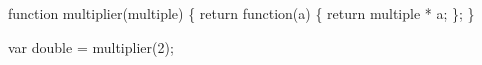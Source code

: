\begin{minipage}{3in}
  \begin{AVerb}[gobble=4,numbers=left]
    function multiplier(multiple) \{
      return function(a) \{ \label{lang_fig2_js_fun}
        return multiple * a;
      \};
    \}
    
    var double = multiplier(2); \label{lang_fig2_js_double}
  \end{AVerb}
\end{minipage}
